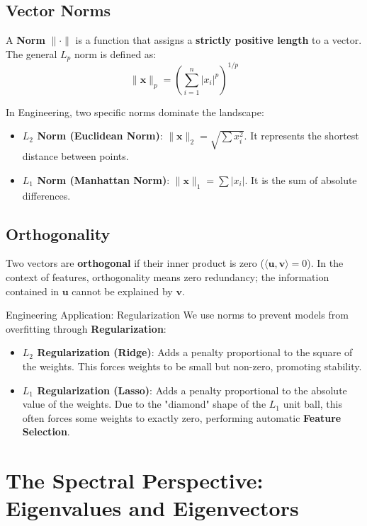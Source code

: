 \documentclass[12pt,a4paper,twoside,openright]{book}
\begin{document}
\subsection{Vector Norms}
A \textbf{Norm} $\|\cdot\|$ is a function that assigns a \textbf{strictly positive length} to a vector. The general $L_p$ norm is defined as:
\begin{equation}
    \|\mathbf{x}\|_p = \left( \sum_{i=1}^n |x_i|^p \right)^{1/p}
\end{equation}

In Engineering, two specific norms dominate the landscape:
\begin{itemize}
    \item \textbf{$L_2$ Norm (Euclidean Norm)}: $\|\mathbf{x}\|_2 = \sqrt{\sum x_i^2}$. It represents the shortest distance between points.
    \item \textbf{$L_1$ Norm (Manhattan Norm)}: $\|\mathbf{x}\|_1 = \sum |x_i|$. It is the sum of absolute differences.
\end{itemize}



\subsection{Orthogonality}
Two vectors are \textbf{orthogonal} if their inner product is zero ($\langle \mathbf{u}, \mathbf{v} \rangle = 0$). In the context of features, orthogonality means zero redundancy; the information contained in $\mathbf{u}$ cannot be explained by $\mathbf{v}$.

\begin{unibobox}{Engineering Application: Regularization}
    We use norms to prevent models from overfitting through \textbf{Regularization}:
    \begin{itemize}
        \item \textbf{$L_2$ Regularization (Ridge)}: Adds a penalty proportional to the square of the weights. This forces weights to be small but non-zero, promoting stability.
        \item \textbf{$L_1$ Regularization (Lasso)}: Adds a penalty proportional to the absolute value of the weights. Due to the "diamond" shape of the $L_1$ unit ball, this often forces some weights to exactly zero, performing automatic \textbf{Feature Selection}.
    \end{itemize}
\end{unibobox}

\section{The Spectral Perspective: Eigenvalues and Eigenvectors}
\end{document}
